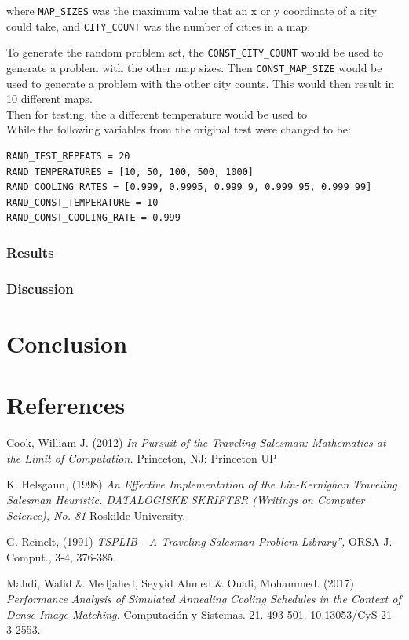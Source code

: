 \documentclass{article}
\begin{document}
where \texttt{MAP\_SIZES} was the maximum value that an x or y coordinate of a city could take, and \texttt{CITY\_COUNT} was the number of cities in a map.

To generate the random problem set, the \texttt{CONST\_CITY\_COUNT} would be used to generate a problem with the other map sizes.
Then \texttt{CONST\_MAP\_SIZE} would be used to generate a problem with the other city counts.
This would then result in 10 different maps.
\\

Then for testing, the a different temperature would be used to 
\\

While the following variables from the original test were changed to be:

\begin{verbatim}
RAND_TEST_REPEATS = 20
RAND_TEMPERATURES = [10, 50, 100, 500, 1000]
RAND_COOLING_RATES = [0.999, 0.9995, 0.999_9, 0.999_95, 0.999_99]
RAND_CONST_TEMPERATURE = 10
RAND_CONST_COOLING_RATE = 0.999
\end{verbatim}

\subsubsection{Results}

\subsubsection{Discussion}

\newpage
\section{Conclusion}



\newpage
\section{References}

\begin{thebibliography}{9}

Cook, William J. (2012) \emph{In Pursuit of the Traveling Salesman: Mathematics at the Limit of Computation.} Princeton, NJ: Princeton UP

K. Helsgaun, (1998) \emph{An Effective Implementation of the Lin-Kernighan Traveling Salesman Heuristic. DATALOGISKE SKRIFTER (Writings on Computer Science), No. 81} Roskilde University.

G. Reinelt, (1991) \emph{TSPLIB - A Traveling Salesman Problem Library”,} ORSA J. Comput., 3-4, 376-385.

Mahdi, Walid \& Medjahed, Seyyid Ahmed \& Ouali, Mohammed. (2017) \emph{Performance Analysis of Simulated Annealing Cooling Schedules in the Context of Dense Image Matching.} Computación y Sistemas. 21. 493-501. 10.13053/CyS-21-3-2553. 
\end{thebibliography}
\end{document}
